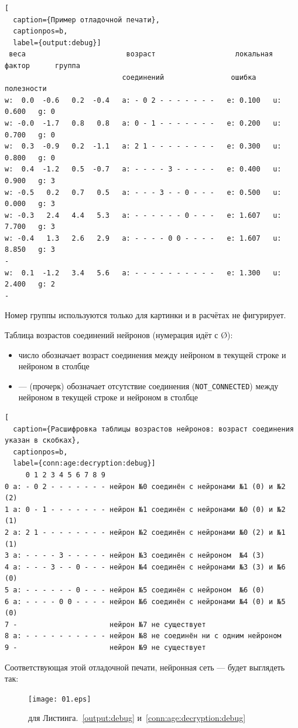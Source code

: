 \documentclass[unicode, 12pt, a4paper,oneside,fleqn]{article}
\begin{document}
\begin{lstlisting}[
  caption={Пример отладочной печати},
  captionpos=b,
  label={output:debug}]
 веса                        возраст                   локальная   фактор      группа
                            соединений                ошибка      полезности
w:  0.0  -0.6   0.2  -0.4   a: - 0 2 - - - - - - -   e: 0.100   u: 0.600   g: 0
w: -0.0  -1.7   0.8   0.8   a: 0 - 1 - - - - - - -   e: 0.200   u: 0.700   g: 0
w:  0.3  -0.9   0.2  -1.1   a: 2 1 - - - - - - - -   e: 0.300   u: 0.800   g: 0
w:  0.4  -1.2   0.5  -0.7   a: - - - - 3 - - - - -   e: 0.400   u: 0.900   g: 3
w: -0.5   0.2   0.7   0.5   a: - - - 3 - - 0 - - -   e: 0.500   u: 0.000   g: 3
w: -0.3   2.4   4.4   5.3   a: - - - - - - 0 - - -   e: 1.607   u: 7.700   g: 3
w: -0.4   1.3   2.6   2.9   a: - - - - 0 0 - - - -   e: 1.607   u: 8.850   g: 3
-
w:  0.1  -1.2   3.4   5.6   a: - - - - - - - - - -   e: 1.300   u: 2.400   g: 2
-
\end{lstlisting}

Номер группы используются только для картинки и в расчётах не фигурирует.


Таблица возрастов соединений нейронов (нумерация идёт с \O):
\begin{itemize}
\item число обозначает возраст соединения между нейроном в текущей
  строке и нейроном в столбце
\item --- (прочерк) обозначает отсутствие соединения
  (\verb'NOT_CONNECTED') между нейроном в текущей строке и нейроном в
  столбце
\end{itemize}
\begin{lstlisting}[
  caption={Расшифровка таблицы возрастов нейронов: возраст соединения указан в скобках},
  captionpos=b,
  label={conn:age:decryption:debug}]
     0 1 2 3 4 5 6 7 8 9
0 a: - 0 2 - - - - - - - нейрон №0 соединён с нейронами №1 (0) и №2 (2)
1 a: 0 - 1 - - - - - - - нейрон №1 соединён с нейронами №0 (0) и №2 (1)
2 a: 2 1 - - - - - - - - нейрон №2 соединён с нейронами №0 (2) и №1 (1)
3 a: - - - - 3 - - - - - нейрон №3 соединён с нейроном  №4 (3)
4 a: - - - 3 - - 0 - - - нейрон №4 соединён с нейронами №3 (3) и №6 (0)
5 a: - - - - - - 0 - - - нейрон №5 соединён с нейроном  №6 (0)
6 a: - - - - 0 0 - - - - нейрон №6 соединён с нейронами №4 (0) и №5 (0)
7 -                      нейрон №7 не существует
8 a: - - - - - - - - - - нейрон №8 не соединён ни с одним нейроном
9 -                      нейрон №9 не существует
\end{lstlisting}

Соответствующая этой отладочной печати, нейронная сеть --- будет
выглядеть так:
\begin{figure}[h]
  \center
  \texttt{[image: 01.eps]} %
  \caption{для Листинга.~\ref{output:debug} и~\ref{conn:age:decryption:debug}}
  \label{graph:img}
\end{figure}
\end{document}
